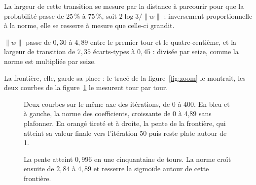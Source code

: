 La largeur de cette transition se mesure par la distance à parcourir pour que la
probabilité passe de $25\,\%$ à $75\,\%$, soit $2\log 3/\|w\|$ : inversement
proportionnelle à la norme, elle se resserre à mesure que celle-ci grandit.

\begin{releve}
$\|w\|$ passe de $0{,}30$ à $4{,}89$ entre le premier tour et le quatre-centième,
et la largeur de transition de $7{,}35$ écarts-types à $0{,}45$ : divisée par
seize, comme la norme est multipliée par seize.
\end{releve}

La frontière, elle, garde sa place : le tracé de la figure~\ref{fig:zoom} le
montrait, les deux courbes de la figure~\ref{fig:suite} le mesurent tour par
tour.

\begin{figure}[htbp]
\centering
\begin{graphique}{Deux courbes sur le même axe des itérations, de 0 à 400. En bleu et à gauche, la norme des coefficients, croissante de 0 à 4,89 sans plafonner. En orangé tireté et à droite, la pente de la frontière, qui atteint sa valeur finale vers l'itération 50 puis reste plate autour de 1.}
\end{graphique}
\caption{La pente atteint $0{,}996$ en une cinquantaine de tours. La norme croît
ensuite de $2{,}84$ à $4{,}89$ et resserre la sigmoïde autour de cette
frontière.}
\label{fig:suite}
\end{figure}
\FloatBarrier

